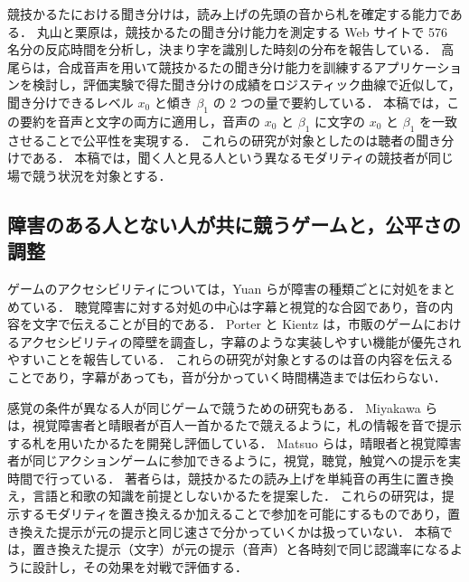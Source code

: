 競技かるたにおける聞き分けは，読み上げの先頭の音から札を確定する能力である．
丸山と栗原は，競技かるたの聞き分け能力を測定する Web サイトで 576 名分の反応時間を分析し，決まり字を識別した時刻の分布を報告している\cite{maruyama2026ec}．
高尾らは，合成音声を用いて競技かるたの聞き分け能力を訓練するアプリケーションを検討し，評価実験で得た聞き分けの成績をロジスティック曲線で近似して，聞き分けできるレベル $x_0$ と傾き $\beta_1$ の 2 つの量で要約している\cite{takao2026}．
本稿では，この要約を音声と文字の両方に適用し，音声の $x_0$ と $\beta_1$ に文字の $x_0$ と $\beta_1$ を一致させることで公平性を実現する．
これらの研究が対象としたのは聴者の聞き分けである．
本稿では，聞く人と見る人という異なるモダリティの競技者が同じ場で競う状況を対象とする．

\subsection{障害のある人とない人が共に競うゲームと，公平さの調整}

ゲームのアクセシビリティについては，Yuan らが障害の種類ごとに対処をまとめている\cite{yuan2011}．
聴覚障害に対する対処の中心は字幕と視覚的な合図であり，音の内容を文字で伝えることが目的である．
Porter と Kientz は，市販のゲームにおけるアクセシビリティの障壁を調査し，字幕のような実装しやすい機能が優先されやすいことを報告している\cite{porter2013}．
これらの研究が対象とするのは音の内容を伝えることであり，字幕があっても，音が分かっていく時間構造までは伝わらない．

感覚の条件が異なる人が同じゲームで競うための研究もある．
Miyakawa らは，視覚障害者と晴眼者が百人一首かるたで競えるように，札の情報を音で提示する札を用いたかるたを開発し評価している\cite{miyakawa2021}．
Matsuo らは，晴眼者と視覚障害者が同じアクションゲームに参加できるように，視覚，聴覚，触覚への提示を実時間で行っている\cite{matsuo2021}．
著者らは，競技かるたの読み上げを単純音の再生に置き換え，言語と和歌の知識を前提としないかるたを提案した\cite{maruyama2025ec}．
これらの研究は，提示するモダリティを置き換えるか加えることで参加を可能にするものであり，置き換えた提示が元の提示と同じ速さで分かっていくかは扱っていない．
本稿では，置き換えた提示（文字）が元の提示（音声）と各時刻で同じ認識率になるように設計し，その効果を対戦で評価する．

